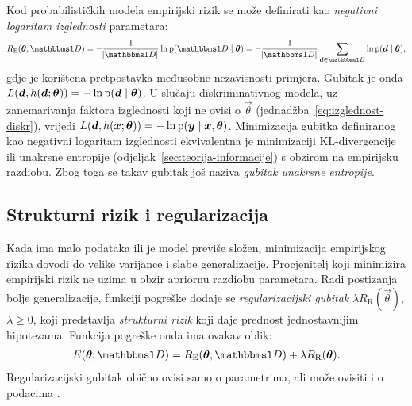 \documentclass[utf8, diplomski, lmodern]{fer}
\begin{document}
Kod probabilističkih modela empirijski rizik se može definirati kao \emph{negativni logaritam izglednosti} parametara:
\begin{align}
R_\text{E}(\vec\theta;\set D) 
= -\frac{1}{\envert{\set D}}\ln\p(\set{D}\mid\vec\theta) 
= -\frac{1}{\envert{\set D}}\sum_{\vec d\in\set{D}} \ln\p(\vec d\mid\vec\theta) \text{,}
\end{align}
gdje je korištena pretpostavka međusobne nezavisnosti primjera. Gubitak je onda $L(\vec d,h(\vec d;\vec\theta)) = -\ln\p(\vec d\mid\vec\theta)$. U slučaju diskriminativnog modela, uz zanemarivanja faktora izglednosti koji ne ovisi o $\vec\theta$ (jednadžba~\eqref{eq:izglednost-diskr}), vrijedi $L(\vec d,h(\vec x;\vec\theta)) = -\ln\p(\vec y\mid\vec x,\vec\theta)$. Minimizacija gubitka definiranog kao negativni logaritam izglednosti ekvivalentna je minimizaciji KL-divergencije ili unakrsne entropije (odjeljak~\ref{sec:teorija-informacije}) s obzirom na empirijsku razdiobu. Zbog toga se takav gubitak još naziva \emph{gubitak unakrsne entropije}.

\subsection{Strukturni rizik i regularizacija}

Kada ima malo podataka ili je model previše složen, minimizacija empirijskog rizika dovodi do velike varijance i slabe generalizacije. Procjenitelj koji minimizira empirijski rizik ne uzima u obzir apriornu razdiobu parametara. Radi postizanja bolje generalizacije, funkciji pogreške dodaje se \emph{regularizacijski gubitak} $\lambda R_\text{R}(\vec\theta)$, $\lambda\geq0$, koji predstavlja \emph{strukturni rizik} koji daje prednost jednostavnijim hipotezama. Funkcija pogreške onda ima ovakav oblik:
\begin{align}
E(\vec\theta;\set{D}) = R_\text{E}(\vec\theta;\set{D}) + \lambda R_\text{R}(\vec\theta) \text{.}
\end{align}
Regularizacijski gubitak obično ovisi samo o parametrima, ali može ovisiti i o podacima \citep{Goodfellow:2016:DL}. 
\end{document}
